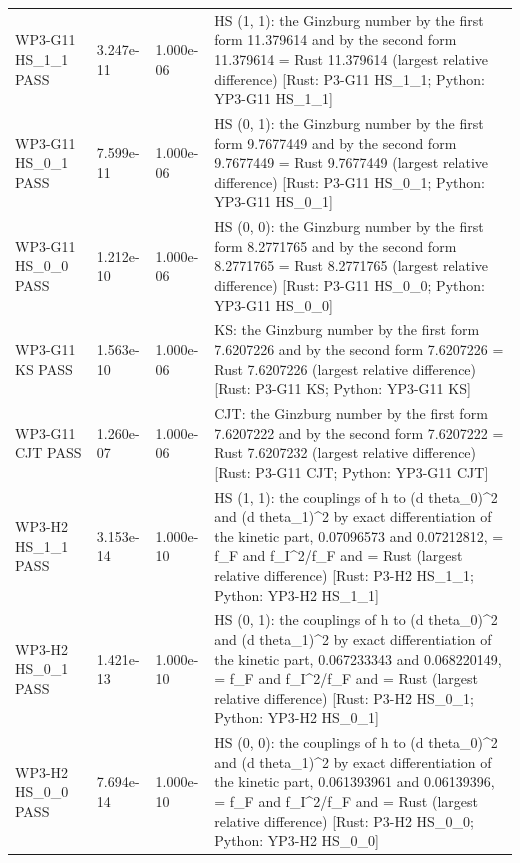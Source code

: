 \documentclass[aps,prd,onecolumn,superscriptaddress,nofootinbib,floatfix,longbibliography]{revtex4-2}
\begin{document}
\begin{longtable}{p{}p{}p{}p{}}
WP3-G11 HS\_1\_1 \newline PASS & 3.247e-11 & 1.000e-06 & HS (1, 1): the Ginzburg number by the first form 11.379614 and by the second form 11.379614 = Rust 11.379614 (largest relative difference) [Rust: P3-G11 HS\_1\_1; Python: YP3-G11 HS\_1\_1] \\
WP3-G11 HS\_0\_1 \newline PASS & 7.599e-11 & 1.000e-06 & HS (0, 1): the Ginzburg number by the first form 9.7677449 and by the second form 9.7677449 = Rust 9.7677449 (largest relative difference) [Rust: P3-G11 HS\_0\_1; Python: YP3-G11 HS\_0\_1] \\
WP3-G11 HS\_0\_0 \newline PASS & 1.212e-10 & 1.000e-06 & HS (0, 0): the Ginzburg number by the first form 8.2771765 and by the second form 8.2771765 = Rust 8.2771765 (largest relative difference) [Rust: P3-G11 HS\_0\_0; Python: YP3-G11 HS\_0\_0] \\
WP3-G11 KS \newline PASS & 1.563e-10 & 1.000e-06 & KS: the Ginzburg number by the first form 7.6207226 and by the second form 7.6207226 = Rust 7.6207226 (largest relative difference) [Rust: P3-G11 KS; Python: YP3-G11 KS] \\
WP3-G11 CJT \newline PASS & 1.260e-07 & 1.000e-06 & CJT: the Ginzburg number by the first form 7.6207222 and by the second form 7.6207222 = Rust 7.6207232 (largest relative difference) [Rust: P3-G11 CJT; Python: YP3-G11 CJT] \\
WP3-H2 HS\_1\_1 \newline PASS & 3.153e-14 & 1.000e-10 & HS (1, 1): the couplings of h to (d theta\_0)\textasciicircum{}2 and (d theta\_1)\textasciicircum{}2 by exact differentiation of the kinetic part, 0.07096573 and 0.07212812, = f\_F and f\_I\textasciicircum{}2/f\_F and = Rust (largest relative difference) [Rust: P3-H2 HS\_1\_1; Python: YP3-H2 HS\_1\_1] \\
WP3-H2 HS\_0\_1 \newline PASS & 1.421e-13 & 1.000e-10 & HS (0, 1): the couplings of h to (d theta\_0)\textasciicircum{}2 and (d theta\_1)\textasciicircum{}2 by exact differentiation of the kinetic part, 0.067233343 and 0.068220149, = f\_F and f\_I\textasciicircum{}2/f\_F and = Rust (largest relative difference) [Rust: P3-H2 HS\_0\_1; Python: YP3-H2 HS\_0\_1] \\
WP3-H2 HS\_0\_0 \newline PASS & 7.694e-14 & 1.000e-10 & HS (0, 0): the couplings of h to (d theta\_0)\textasciicircum{}2 and (d theta\_1)\textasciicircum{}2 by exact differentiation of the kinetic part, 0.061393961 and 0.06139396, = f\_F and f\_I\textasciicircum{}2/f\_F and = Rust (largest relative difference) [Rust: P3-H2 HS\_0\_0; Python: YP3-H2 HS\_0\_0] \\

\end{longtable}
\end{document}
